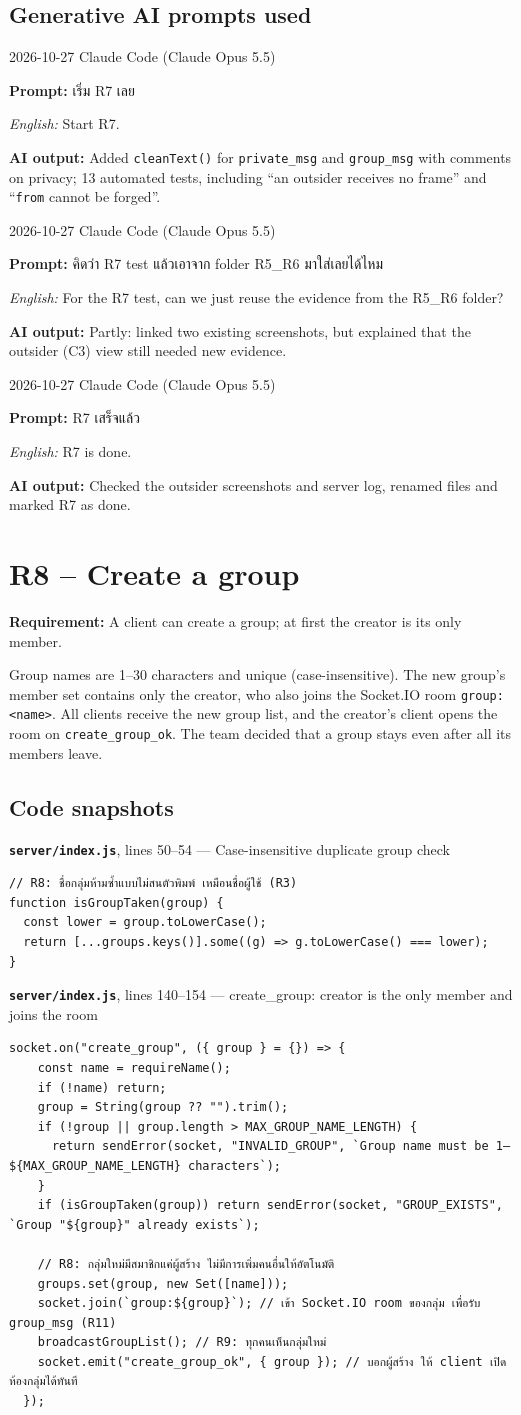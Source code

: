 \documentclass[11pt,a4paper]{article}
\newcommand{\code}[1]{\texttt{#1}}
\newcommand{\req}[1]{\begin{tcolorbox}[colback=accent!6,colframe=accent!60,boxrule=0.5pt,left=4pt,right=4pt,top=2pt,bottom=2pt]\textbf{Requirement:} #1\end{tcolorbox}}
\newcommand{\snap}[3]{\par\medskip\textbf{\code{#1}}, lines #2 --- #3}
\newcommand{\promptbox}[4]{%
\begin{tcolorbox}[colback=codebg,colframe=gray!50,boxrule=0.4pt,left=4pt,right=4pt,top=2pt,bottom=2pt]
{\small #1 \quad Claude Code (Claude Opus 5.5)}\par
\textbf{Prompt:} #2\par
\textit{English:} #3\par
\textbf{AI output:} #4
\end{tcolorbox}}
\begin{document}
\subsection*{Generative AI prompts used}
\promptbox{2026-10-27}{เริ่ม R7 เลย}{Start R7.}{Added \code{cleanText()} for \code{private\_msg} and \code{group\_msg} with comments on privacy; 13 automated tests, including “an outsider receives no frame” and “\code{from} cannot be forged”.}
\promptbox{2026-10-27}{คิดว่า R7 test แล้วเอาจาก folder R5\_R6 มาใส่เลยได้ไหม}{For the R7 test, can we just reuse the evidence from the R5\_R6 folder?}{Partly: linked two existing screenshots, but explained that the outsider (C3) view still needed new evidence.}
\promptbox{2026-10-27}{R7 เสร็จแล้ว}{R7 is done.}{Checked the outsider screenshots and server log, renamed files and marked R7 as done.}

\clearpage
\section{R8 -- Create a group}
\req{A client can create a group; at first the creator is its only member.}

Group names are 1--30 characters and unique (case-insensitive). The new group's
member set contains only the creator, who also joins the Socket.IO room \code{group:<name>}. All
clients receive the new group list, and the creator's client opens the room on
\code{create\_group\_ok}. The team decided that a group stays even after all its members leave.

\subsection*{Code snapshots}
\snap{server/index.js}{50--54}{Case-insensitive duplicate group check}
\begin{Verbatim}[firstnumber=50]
// R8: ชื่อกลุ่มห้ามซ้ำแบบไม่สนตัวพิมพ์ เหมือนชื่อผู้ใช้ (R3)
function isGroupTaken(group) {
  const lower = group.toLowerCase();
  return [...groups.keys()].some((g) => g.toLowerCase() === lower);
}
\end{Verbatim}

\snap{server/index.js}{140--154}{create\_group: creator is the only member and joins the room}
\begin{Verbatim}[firstnumber=140]
  socket.on("create_group", ({ group } = {}) => {
    const name = requireName();
    if (!name) return;
    group = String(group ?? "").trim();
    if (!group || group.length > MAX_GROUP_NAME_LENGTH) {
      return sendError(socket, "INVALID_GROUP", `Group name must be 1–${MAX_GROUP_NAME_LENGTH} characters`);
    }
    if (isGroupTaken(group)) return sendError(socket, "GROUP_EXISTS", `Group "${group}" already exists`);

    // R8: กลุ่มใหม่มีสมาชิกแค่ผู้สร้าง ไม่มีการเพิ่มคนอื่นให้อัตโนมัติ
    groups.set(group, new Set([name]));
    socket.join(`group:${group}`); // เข้า Socket.IO room ของกลุ่ม เพื่อรับ group_msg (R11)
    broadcastGroupList(); // R9: ทุกคนเห็นกลุ่มใหม่
    socket.emit("create_group_ok", { group }); // บอกผู้สร้าง ให้ client เปิดห้องกลุ่มได้ทันที
  });
\end{Verbatim}
\end{document}
